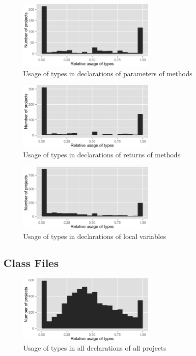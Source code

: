 \begin{figure}[h]
\centering 
\includegraphics[width=0.6\textwidth]{../aosd_2014/analysis/result/script/script/histograms/8_Method_Parameter.png} 
\caption{Usage of types in declarations of parameters of methods}
\end{figure}

\begin{figure}[h]
\centering 
\includegraphics[width=0.6\textwidth]{../aosd_2014/analysis/result/script/script/histograms/7_Method_Return.png} 
\caption{Usage of types in declarations of returns of methods}
\end{figure}

\begin{figure}[h]
\centering 
\includegraphics[width=0.6\textwidth]{../aosd_2014/analysis/result/script/script/histograms/6_Local_Variable.png} 
\caption{Usage of types in declarations of local variables}
\end{figure}

\FloatBarrier

\subsection*{Class Files}

\begin{figure}[h]
\centering 
\includegraphics[width=0.6\textwidth]{../aosd_2014/analysis/result/script/class/histograms/5_all_types.png} 
\caption{Usage of types in all declarations of all projects}
\end{figure}

